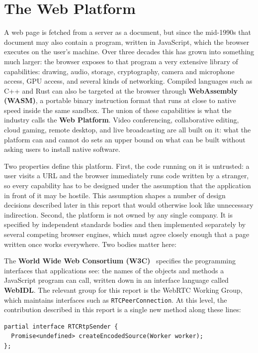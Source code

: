 \documentclass[11pt]{article}
\begin{document}
\section{The Web Platform}
\label{sec:webplatform}

A web page is fetched from a server as a document, but since the mid-1990s that document may also contain a program, written in JavaScript, which the browser executes on the user's machine. Over three decades this has grown into something much larger: the browser exposes to that program a very extensive library of capabilities: drawing, audio, storage, cryptography, camera and microphone access, GPU access, and several kinds of networking. Compiled languages such as C++ and Rust can also be targeted at the browser through \textbf{WebAssembly (WASM)}, a portable binary instruction format that runs at close to native speed inside the same sandbox. The union of these capabilities is what the industry calls the \textbf{Web Platform}. Video conferencing, collaborative editing, cloud gaming, remote desktop, and live broadcasting are all built on it: what the platform can and cannot do sets an upper bound on what can be built without asking users to install native software.

Two properties define this platform. First, the code running on it is untrusted: a user visits a URL and the browser immediately runs code written by a stranger, so every capability has to be designed under the assumption that the application in front of it may be hostile. This assumption shapes a number of design decisions described later in this report that would otherwise look like unnecessary indirection. Second, the platform is not owned by any single company. It is specified by independent standards bodies and then implemented separately by several competing browser engines, which must agree closely enough that a page written once works everywhere. Two bodies matter here:

The \textbf{World Wide Web Consortium (W3C)}~\cite{w3c} specifies the programming interfaces that applications see: the names of the objects and methods a JavaScript program can call, written down in an interface language called \textbf{WebIDL}. The relevant group for this report is the WebRTC Working Group, which maintains interfaces such as \texttt{RTCPeerConnection}. At this level, the contribution described in this report is a single new method along these lines:

\begin{lstlisting}[language=webidl]
partial interface RTCRtpSender {
  Promise<undefined> createEncodedSource(Worker worker);
};
\end{lstlisting}
\end{document}

